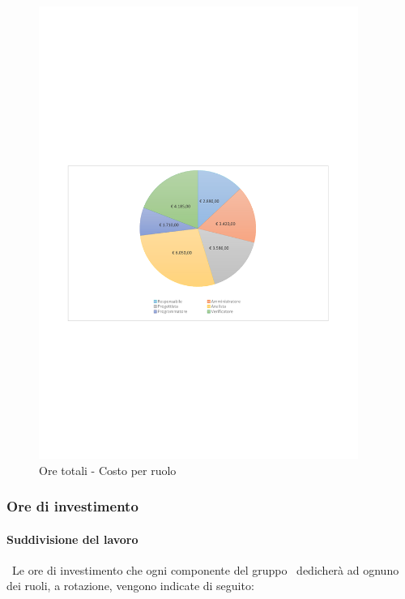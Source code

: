 \documentclass[../PianoProgetto.tex]{subfiles}
\begin{document}
	\begin{figure}[H]
		\centering
		\includegraphics[width=0.93\textwidth , trim=1.5cm 9cm 1.5cm 9cm]{grafici/Riepilogo/Totali/costo}
			\caption{Ore totali - Costo per ruolo}
		\label{fig:CircleChart-totale_ore}
	\end{figure}
\vfill
\newpage
	
	\subsubsection{Ore di investimento}
				\paragraph{Suddivisione del lavoro}\
					Le ore di investimento che ogni componente del gruppo \leaf\ dedicherà ad ognuno dei ruoli, a rotazione, vengono indicate di seguito:
	
\end{document}
